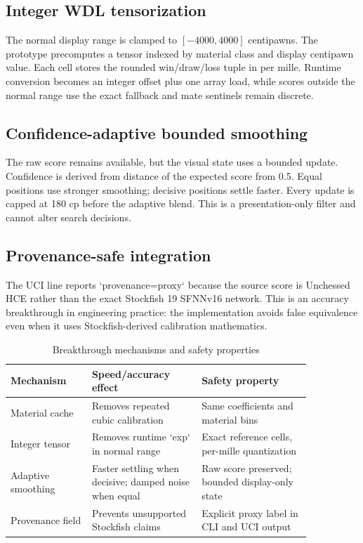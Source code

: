 \documentclass[10pt,conference]{IEEEtran}
\begin{document}
\subsection{Integer WDL tensorization}
The normal display range is clamped to $[-4000,4000]$ centipawns. The prototype precomputes a tensor indexed by material class and display centipawn value. Each cell stores the rounded win/draw/loss tuple in per mille. Runtime conversion becomes an integer offset plus one array load, while scores outside the normal range use the exact fallback and mate sentinels remain discrete.

\subsection{Confidence-adaptive bounded smoothing}
The raw score remains available, but the visual state uses a bounded update. Confidence is derived from distance of the expected score from 0.5. Equal positions use stronger smoothing; decisive positions settle faster. Every update is capped at 180 cp before the adaptive blend. This is a presentation-only filter and cannot alter search decisions.

\subsection{Provenance-safe integration}
The UCI line reports `provenance=proxy` because the source score is Unchessed HCE rather than the exact Stockfish 19 SFNNv16 network. This is an accuracy breakthrough in engineering practice: the implementation avoids false equivalence even when it uses Stockfish-derived calibration mathematics.

\begin{table}[t]
\centering
\caption{Breakthrough mechanisms and safety properties}
\label{tab:breakthroughs}
\begin{tabular}{p{0.23\linewidth}p{0.31\linewidth}p{0.31\linewidth}}
\toprule
Mechanism & Speed/accuracy effect & Safety property\\
\midrule
Material cache & Removes repeated cubic calibration & Same coefficients and material bins\\
Integer tensor & Removes runtime `exp` in normal range & Exact reference cells, per-mille quantization\\
Adaptive smoothing & Faster settling when decisive; damped noise when equal & Raw score preserved; bounded display-only state\\
Provenance field & Prevents unsupported Stockfish claims & Explicit proxy label in CLI and UCI output\\
\bottomrule
\end{tabular}
\end{table}
\end{document}
